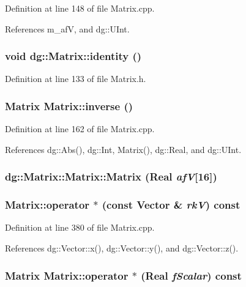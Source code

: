 Definition at line 148 of file Matrix.cpp.

References m\_\-af\-V, and dg::UInt.
\subsubsection{\setlength{\rightskip}{0pt plus 5cm}void dg::Matrix::identity ()\hspace{0.3cm}{\tt  [inline]}}\label{classdg_1_1Matrix_a28}




Definition at line 133 of file Matrix.h.
\subsubsection{\setlength{\rightskip}{0pt plus 5cm}Matrix Matrix::inverse ()}\label{classdg_1_1Matrix_a30}




Definition at line 162 of file Matrix.cpp.

References dg::Abs(), dg::Int, Matrix(), dg::Real, and dg::UInt.
\subsubsection{\setlength{\rightskip}{0pt plus 5cm}dg::Matrix::Matrix::Matrix ({\bf Real} {\em af\-V}[16])}\label{classdg_1_1Matrix_a3}


\subsubsection{ Matrix::operator $\ast$ (const {\bf Vector} \& {\em rk\-V}) const}\label{classdg_1_1Matrix_a26}




Definition at line 380 of file Matrix.cpp.

References dg::Vector::x(), dg::Vector::y(), and dg::Vector::z().
\subsubsection{\setlength{\rightskip}{0pt plus 5cm}Matrix Matrix::operator $\ast$ ({\bf Real} {\em f\-Scalar}) const}\label{classdg_1_1Matrix_a18}




